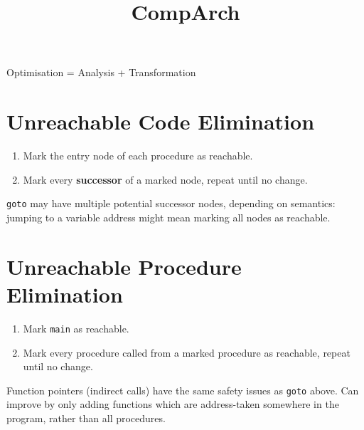 \documentclass[a4paper, 11pt]{article}
\title{\vspace{-2.5cm}CompArch\vspace{-2cm}}
\author{}
\date{}
\begin{document}
\maketitle

Optimisation = Analysis + Transformation

\section*{Unreachable Code Elimination}
{
    \begin{enumerate}
    \item Mark the entry node of each procedure as reachable.
    \item Mark every \textbf{successor} of a marked node, repeat until no change.
    \end{enumerate}

    \texttt{goto} may have multiple potential successor nodes, depending on semantics: jumping to a variable address might mean marking all nodes as reachable.
}
\section*{Unreachable Procedure Elimination}
{
    \begin{enumerate}
    \item Mark \texttt{main} as reachable.
    \item Mark every procedure called from a marked procedure as reachable, repeat until no change.
    \end{enumerate}

    Function pointers (indirect calls) have the same safety issues as \texttt{goto} above. Can improve by only adding functions which are address-taken somewhere in the program, rather than all procedures.
}
\end{document}
